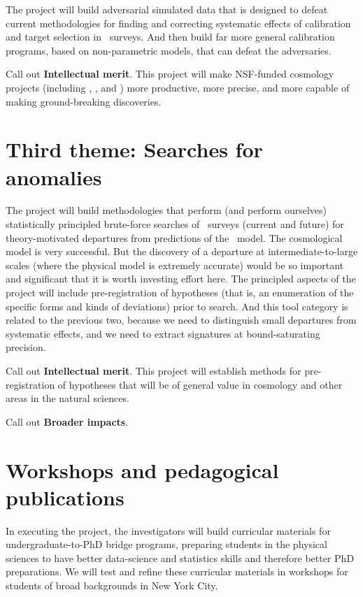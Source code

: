 \documentclass[12pt, fullpage, letterpaper]{article}
\begin{document}
The project will build adversarial simulated data that is
designed to defeat current methodologies for finding and correcting
systematic effects of calibration and target selection in \LSS\ 
surveys. And then build far more general calibration
programs, based on non-parametric models, that can defeat the
adversaries.

Call out \textbf{Intellectual merit}.
This project will make NSF-funded cosmology projects (including
\SDSSIV, \DESI, and \LSST) more productive, more precise, and more
capable of making ground-breaking discoveries.

\section{Third theme: Searches for anomalies}

The project will build methodologies that perform (and perform
ourselves) statistically principled brute-force searches of \LSS\ 
surveys (current and future) for theory-motivated departures from
predictions of the \LCDM\ model.
The cosmological model is very successful.
But the discovery of a departure at intermediate-to-large scales
(where the physical model is extremely accurate) would be so important
and significant that it is worth investing effort here.
The principled aspects of the project will include pre-registration of
hypotheses (that is, an enumeration of the specific forms and kinds of
deviations) prior to search.
And this tool category is related to the previous two, because we need
to distinguish small departures from systematic effects, and we need
to extract signatures at bound-saturating precision.

Call out \textbf{Intellectual merit}.
This project will establish methods for pre-registration of hypotheses that
will be of general value in cosmology and other areas in the natural
sciences.

Call out \textbf{Broader impacts}.

\section{Workshops and pedagogical publications}

In executing the project, the investigators will build curricular
materials for undergraduate-to-PhD bridge programs, preparing students
in the physical sciences to have better data-science and statistics
skills and therefore better PhD preparations.
We will test and refine these curricular materials in workshops for
students of broad backgrounds in New York City.
\end{document}
